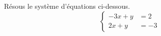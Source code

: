 %
%
    Résous le système d'équations ci-dessous.
    \[\left\{\begin{aligned}
            -3x+y & = 2 \\
            2x+y  & =-3
        \end{aligned}\right.\]
